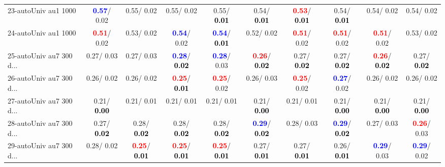 \begin{table}[h]
\begin{center}
{\begin{tabular}{lc|c|c|c|c|c|c|c|c}
23-autoUniv au1 1000 & \textcolor{blue}{\textbf{  0.57}}/  0.02 &   0.55/  0.02 &   0.55/  0.02 &   0.55/\textcolor{black}{\textbf{  0.01}} &   0.54/\textcolor{black}{\textbf{  0.01}} & \textcolor{red}{\textbf{  0.53}}/\textcolor{black}{\textbf{  0.01}} &   0.54/\textcolor{black}{\textbf{  0.01}} &   0.54/  0.02 &   0.54/  0.02 \\
24-autoUniv au1 1000 & \textcolor{red}{\textbf{  0.51}}/  0.02 &   0.53/  0.02 & \textcolor{blue}{\textbf{  0.54}}/  0.02 & \textcolor{blue}{\textbf{  0.54}}/\textcolor{black}{\textbf{  0.01}} &   0.52/  0.02 & \textcolor{red}{\textbf{  0.51}}/  0.02 & \textcolor{red}{\textbf{  0.51}}/  0.02 & \textcolor{red}{\textbf{  0.51}}/  0.02 &   0.53/  0.02 \\
25-autoUniv au7 300 d... &   0.27/  0.03 &   0.27/  0.03 & \textcolor{blue}{\textbf{  0.28}}/\textcolor{black}{\textbf{  0.02}} & \textcolor{blue}{\textbf{  0.28}}/  0.03 & \textcolor{red}{\textbf{  0.26}}/\textcolor{black}{\textbf{  0.02}} &   0.27/\textcolor{black}{\textbf{  0.02}} &   0.27/\textcolor{black}{\textbf{  0.02}} & \textcolor{red}{\textbf{  0.26}}/\textcolor{black}{\textbf{  0.02}} &   0.27/\textcolor{black}{\textbf{  0.02}} \\
26-autoUniv au7 300 d... &   0.26/  0.02 &   0.26/  0.02 & \textcolor{red}{\textbf{  0.25}}/\textcolor{black}{\textbf{  0.01}} & \textcolor{red}{\textbf{  0.25}}/  0.02 &   0.26/  0.03 & \textcolor{red}{\textbf{  0.25}}/  0.02 & \textcolor{blue}{\textbf{  0.27}}/  0.02 &   0.26/  0.02 &   0.26/  0.02 \\
27-autoUniv au7 300 d... &   0.21/\textcolor{black}{\textbf{  0.00}} &   0.21/  0.01 &   0.21/  0.01 &   0.21/  0.01 &   0.21/\textcolor{black}{\textbf{  0.00}} &   0.21/  0.01 &   0.21/\textcolor{black}{\textbf{  0.00}} &   0.21/\textcolor{black}{\textbf{  0.00}} &   0.21/\textcolor{black}{\textbf{  0.00}} \\
28-autoUniv au7 300 d... &   0.27/\textcolor{black}{\textbf{  0.02}} &   0.28/\textcolor{black}{\textbf{  0.02}} &   0.28/\textcolor{black}{\textbf{  0.02}} &   0.28/\textcolor{black}{\textbf{  0.02}} & \textcolor{blue}{\textbf{  0.29}}/\textcolor{black}{\textbf{  0.02}} &   0.28/  0.03 & \textcolor{blue}{\textbf{  0.29}}/\textcolor{black}{\textbf{  0.02}} &   0.27/  0.03 & \textcolor{red}{\textbf{  0.26}}/  0.03 \\ \hline
29-autoUniv au7 300 d... &   0.28/  0.02 & \textcolor{red}{\textbf{  0.25}}/\textcolor{black}{\textbf{  0.01}} & \textcolor{red}{\textbf{  0.25}}/\textcolor{black}{\textbf{  0.01}} & \textcolor{red}{\textbf{  0.25}}/\textcolor{black}{\textbf{  0.01}} &   0.27/\textcolor{black}{\textbf{  0.01}} &   0.27/\textcolor{black}{\textbf{  0.01}} &   0.26/\textcolor{black}{\textbf{  0.01}} & \textcolor{blue}{\textbf{  0.29}}/  0.03 & \textcolor{blue}{\textbf{  0.29}}/  0.02 \\

\end{tabular}}
\end{center}
\end{table}
